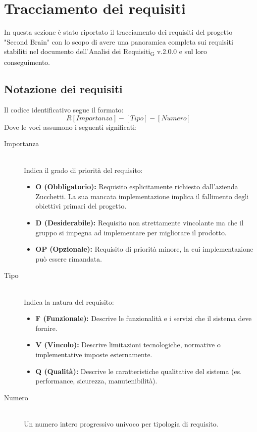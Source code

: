 \documentclass[11pt,a4paper]{article}
\newcommand{\gls}[1]{#1\textsubscript{G}}
\begin{document}
\section{Tracciamento dei requisiti}
In questa sezione è stato riportato il tracciamento dei requisiti del progetto "Second Brain" con lo scopo di avere una panoramica completa sui requisiti stabiliti nel documento dell'\gls{Analisi dei Requisiti} v.2.0.0 e sul loro conseguimento.

\subsection{Notazione dei requisiti}
Il codice identificativo segue il formato:
\[
R[Importanza]-[Tipo]-[Numero]
\]
Dove le voci assumono i seguenti significati:

\begin{description}
    \item[Importanza] \hfill \\
    Indica il grado di priorità del requisito:
    \begin{itemize}
        \item \textbf{O (Obbligatorio):} Requisito esplicitamente richiesto dall'azienda Zucchetti. La sua mancata implementazione implica il fallimento degli obiettivi primari del progetto.
        \item \textbf{D (Desiderabile):} Requisito non strettamente vincolante ma che il gruppo si impegna ad implementare per migliorare il prodotto.
        \item \textbf{OP (Opzionale):} Requisito di priorità minore, la cui implementazione può essere rimandata.
    \end{itemize}
    
    \item[Tipo] \hfill \\
    Indica la natura del requisito:
    \begin{itemize}
        \item \textbf{F (Funzionale):} Descrive le funzionalità e i servizi che il sistema deve fornire.
        \item \textbf{V (Vincolo):} Descrive limitazioni tecnologiche, normative o implementative imposte esternamente.
        \item \textbf{Q (Qualità):} Descrive le caratteristiche qualitative del sistema (es. performance, sicurezza, manutenibilità).
    \end{itemize}
    
    \item[Numero] \hfill \\
    Un numero intero progressivo univoco per tipologia di requisito.
\end{description}
\end{document}
